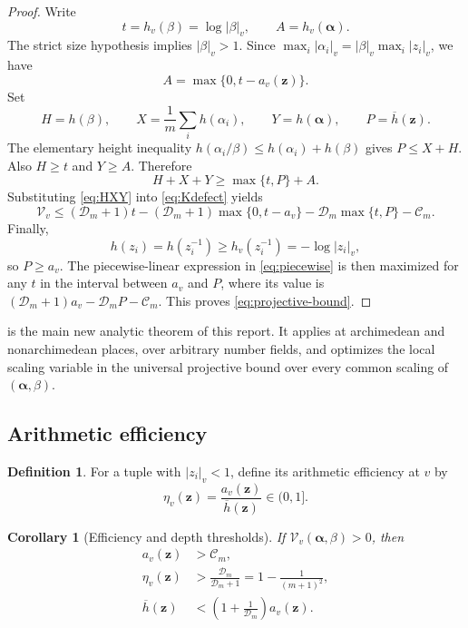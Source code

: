 \documentclass[11pt]{article}
\newtheorem{corollary}[theorem]{Corollary}
\theoremstyle{definition}
\newtheorem{definition}[theorem]{Definition}
\newcommand{\D}{\mathcal D}
\newcommand{\Kc}{\mathcal C}
\newcommand{\Vdef}{\mathcal V}
\begin{document}
\begin{proof}
Write
\[
 t=h_v(\beta)=\log|\beta|_v,
 \qquad A=h_v(\boldsymbol\alpha).
\]
The strict size hypothesis implies $|\beta|_v>1$.  Since
$\max_i|\alpha_i|_v=|\beta|_v\max_i|z_i|_v$, we have
\begin{equation}\label{eq:Ata}
  A=\max\{0,t-a_v(\mathbf z)\}.
\end{equation}
Set
\[
 H=h(\beta),\qquad X=\frac1m\sum_i h(\alpha_i),\qquad
 Y=h(\boldsymbol\alpha),\qquad P=\overline h(\mathbf z).
\]
The elementary height inequality $h(\alpha_i/\beta)\le h(\alpha_i)+h(\beta)$ gives
$P\le X+H$.  Also $H\ge t$ and $Y\ge A$.  Therefore
\begin{equation}\label{eq:HXY}
  H+X+Y\ge \max\{t,P\}+A.
\end{equation}
Substituting \eqref{eq:HXY} into \eqref{eq:Kdefect} yields
\begin{equation}\label{eq:piecewise}
 \Vdef_v\le
 (\D_m+1)t-(\D_m+1)\max\{0,t-a_v\}
 -\D_m\max\{t,P\}-\Kc_m.
\end{equation}
Finally,
\[
 h(z_i)=h(z_i^{-1})\ge h_v(z_i^{-1})=-\log|z_i|_v,
\]
so $P\ge a_v$.  The piecewise-linear expression in \eqref{eq:piecewise} is then maximized
for any $t$ in the interval between $a_v$ and $P$, where its value is
$(\D_m+1)a_v-\D_mP-\Kc_m$.  This proves \eqref{eq:projective-bound}.
\end{proof}

\begin{provedbox}
 is the main new analytic theorem of this report.  It applies at
archimedean and nonarchimedean places, over arbitrary number fields, and optimizes the local scaling variable in the universal projective bound over every
common scaling of $(\boldsymbol\alpha,\beta)$.
\end{provedbox}

\subsection{Arithmetic efficiency}

\begin{definition}
For a tuple with $|z_i|_v<1$, define its arithmetic efficiency at $v$ by
\[
  \eta_v(\mathbf z)=\frac{a_v(\mathbf z)}{\overline h(\mathbf z)}\in(0,1].
\]
\end{definition}

\begin{corollary}[Efficiency and depth thresholds]\label{cor:efficiency}
If $\Vdef_v(\boldsymbol\alpha,\beta)>0$, then
\begin{align}
  a_v(\mathbf z)&>\Kc_m,\label{eq:depth}\\
  \eta_v(\mathbf z)&>\frac{\D_m}{\D_m+1}
      =1-\frac1{(m+1)^2},\label{eq:eta}\\
  \overline h(\mathbf z)&<\left(1+\frac1{\D_m}\right)a_v(\mathbf z).
  \label{eq:Pupper}
\end{align}
\end{corollary}
\end{document}
